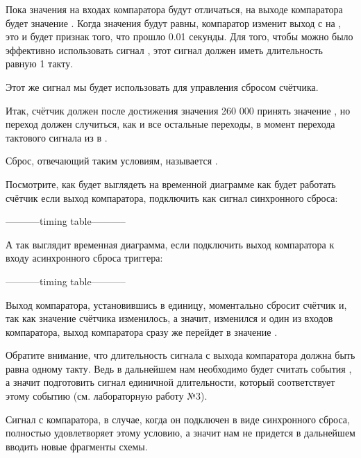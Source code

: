 \par{Пока значения на входах компаратора будут отличаться, на выходе компаратора будет значение . Когда значения будут равны, компаратор изменит выход с  на , это и будет признак того, что прошло 0.01 секунды. Для того, чтобы можно было эффективно использовать сигнал , этот сигнал должен иметь длительность равную 1 такту.}

\par{Этот же сигнал мы будет использовать для управления сбросом счётчика.}

\par{Итак, счётчик должен после достижения значения 260 000 принять значение , но переход должен случиться, как и все остальные переходы, в момент перехода тактового сигнала из  в .}

\par{Сброс, отвечающий таким условиям, называется .}

\par{Посмотрите, как будет выглядеть на временной диаграмме как будет работать счётчик если выход компаратора, подключить как сигнал синхронного сброса:}

\par{-----------timing table-----------}

\par{А так выглядит временная диаграмма, если подключить выход компаратора к входу асинхронного сброса триггера:}

\par{-----------timing table-----------}

\par{Выход компаратора, установившись в единицу, моментально сбросит счётчик и, так как значение счётчика изменилось, а значит, изменился и один из входов компаратора, выход компаратора сразу же перейдет в значение .}

\par{Обратите внимание, что длительность сигнала с выхода компаратора должна быть равна одному такту. Ведь в дальнейшем нам необходимо будет считать события , а значит подготовить сигнал единичной длительности, который соответствует этому событию (см. лабораторную работу №3).}

\par{Сигнал с компаратора, в случае, когда он подключен в виде синхронного сброса, полностью удовлетворяет этому условию, а значит нам не придется в дальнейшем вводить новые фрагменты схемы.}

